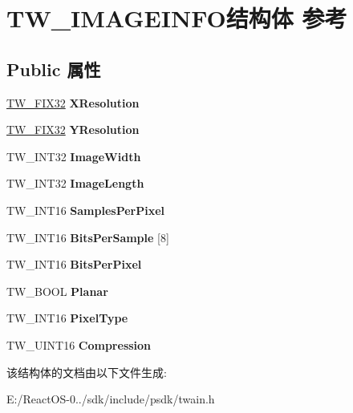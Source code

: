 \hypertarget{struct_t_w___i_m_a_g_e_i_n_f_o}{}\section{T\+W\+\_\+\+I\+M\+A\+G\+E\+I\+N\+F\+O结构体 参考}
\label{struct_t_w___i_m_a_g_e_i_n_f_o}
\subsection*{Public 属性}
\begin{DoxyCompactItemize}
\item 
\mbox{\label{struct_t_w___i_m_a_g_e_i_n_f_o_a0d9c2f6ff77b1f1d6e77e609605bbb97}} 
\hyperlink{struct_t_w___f_i_x32}{T\+W\+\_\+\+F\+I\+X32} {\bfseries X\+Resolution}
\item 
\mbox{\label{struct_t_w___i_m_a_g_e_i_n_f_o_ae4b908f4522c25549581a8ce44e768f7}} 
\hyperlink{struct_t_w___f_i_x32}{T\+W\+\_\+\+F\+I\+X32} {\bfseries Y\+Resolution}
\item 
\mbox{\label{struct_t_w___i_m_a_g_e_i_n_f_o_ae4358cc531066564ea593f84d14c9405}} 
T\+W\+\_\+\+I\+N\+T32 {\bfseries Image\+Width}
\item 
\mbox{\label{struct_t_w___i_m_a_g_e_i_n_f_o_ac004ebcfe1e85e29b68b12bd55b04553}} 
T\+W\+\_\+\+I\+N\+T32 {\bfseries Image\+Length}
\item 
\mbox{\label{struct_t_w___i_m_a_g_e_i_n_f_o_a3093345383d90b8372e877df4bb733a5}} 
T\+W\+\_\+\+I\+N\+T16 {\bfseries Samples\+Per\+Pixel}
\item 
\mbox{\label{struct_t_w___i_m_a_g_e_i_n_f_o_a2ade706303005635eee56627b5a7024b}} 
T\+W\+\_\+\+I\+N\+T16 {\bfseries Bits\+Per\+Sample} \mbox{[}8\mbox{]}
\item 
\mbox{\label{struct_t_w___i_m_a_g_e_i_n_f_o_abda9f6c921c2abeacf22604b505ea39f}} 
T\+W\+\_\+\+I\+N\+T16 {\bfseries Bits\+Per\+Pixel}
\item 
\mbox{\label{struct_t_w___i_m_a_g_e_i_n_f_o_a0965871a3b27311a54e15802539cc3dc}} 
T\+W\+\_\+\+B\+O\+OL {\bfseries Planar}
\item 
\mbox{\label{struct_t_w___i_m_a_g_e_i_n_f_o_a16249ddf1a48b83cba0270c233151502}} 
T\+W\+\_\+\+I\+N\+T16 {\bfseries Pixel\+Type}
\item 
\mbox{\label{struct_t_w___i_m_a_g_e_i_n_f_o_ae6963eec7f7b12d8acf2a893373adc13}} 
T\+W\+\_\+\+U\+I\+N\+T16 {\bfseries Compression}
\end{DoxyCompactItemize}


该结构体的文档由以下文件生成\+:\begin{DoxyCompactItemize}
\item 
E\+:/\+React\+O\+S-\/0../sdk/include/psdk/twain.\+h\end{DoxyCompactItemize}

